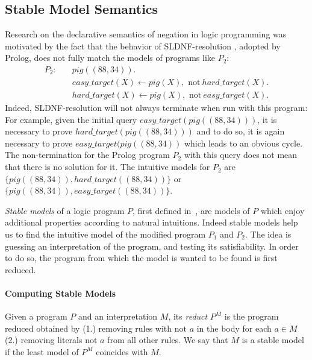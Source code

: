 \subsection{Stable Model Semantics}
Research on the declarative semantics of negation in logic programming was motivated by the fact that the behavior of SLDNF-resolution \cite{sldnf}, adopted by Prolog,  does not fully match the models of programs like \(P_2\):
\begin{align}
  P_2 \colon \quad
&\mathit{pig}((88,34)). \\
&\mathit{easy\_target}(X) \leftarrow pig(X), \text{ not}\: \mathit{hard\_target}(X). \label{eq:3}\\ 
&\mathit{hard\_target}(X) \leftarrow pig(X), \text{ not}\: \mathit{easy\_target}(X). \label{eq:4}
\end{align}
Indeed, SLDNF-resolution will not always terminate when run with this program: For example, given the initial query \(\mathit{easy\_target}(pig((88,34)))\), it is necessary to prove \(\mathit{hard\_target}(pig((88,34)))\) and to do so, it is again necessary to prove \(\mathit{easy\_target}(pig((88,34))\) which leads to an obvious cycle.
The non-termination for the Prolog program \(P_2\) with this query does not mean that there is no solution for it. The intuitive models for \(P_2\) are \(\{pig((88,34)), \mathit{hard\_target}((88,34))\}\) or \(\{pig((88,34)), \mathit{easy\_target}((88,34))\}\).

\emph{Stable models} of a logic program \(P\), first defined in~\cite{Gelfond-Lifschitz}, are models of \(P\) which enjoy additional properties according to natural intuitions.
Indeed stable models help us to find the intuitive model of the modified program \(P_1\) and \(P_2\). The idea is guessing an interpretation of the program, and testing its satisfiability. In order to do so, the program from which the model is wanted to be found is first reduced. 

\paragraph{Computing Stable Models} Given a program \(P\) and an interpretation \(M\), its \emph{reduct} \(P^M\) is the program reduced obtained by (1.) removing rules with \(\text{not } a\) in the body for each \(a \in M\) (2.) removing literals \(\text{not } a\) from all other rules. %
We say that \(M\) is a stable model if the least model of \(P^M\) coincides with \(M\).


